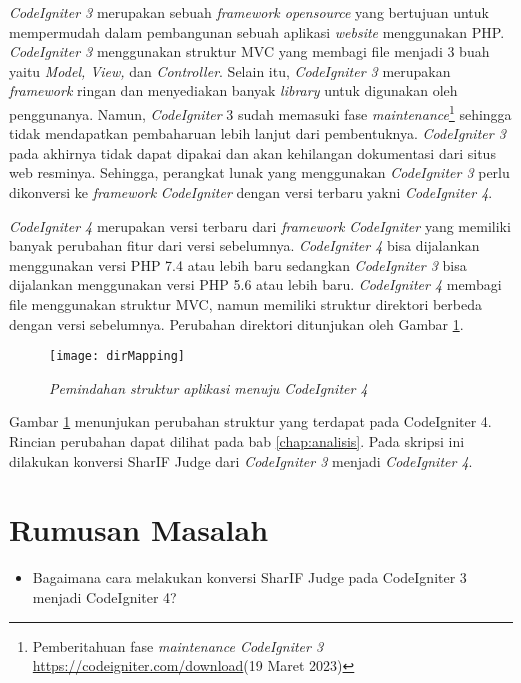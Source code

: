 \textit{CodeIgniter 3} merupakan sebuah \textit{framework opensource} yang bertujuan untuk mempermudah dalam pembangunan sebuah aplikasi \textit{website} menggunakan PHP. \textit{CodeIgniter 3} menggunakan struktur MVC yang membagi file menjadi 3 buah yaitu \textit{Model, View,} dan \textit{Controller}. Selain itu, \textit{CodeIgniter 3} merupakan \textit{framework} ringan dan menyediakan banyak \textit{library} untuk digunakan oleh penggunanya\cite{ci3:22}. Namun, \textit{CodeIgniter} 3 sudah memasuki fase \textit{maintenance}\footnote{Pemberitahuan fase \textit{maintenance CodeIgniter 3} \url{https://codeigniter.com/download}(19 Maret 2023)} sehingga tidak mendapatkan pembaharuan lebih lanjut dari pembentuknya. \textit{CodeIgniter 3} pada akhirnya tidak dapat dipakai dan akan kehilangan dokumentasi dari situs web resminya. Sehingga, perangkat lunak yang menggunakan \textit{CodeIgniter 3} perlu dikonversi ke \textit{framework} \textit{CodeIgniter} dengan versi terbaru yakni \textit{CodeIgniter 4}.

\textit{CodeIgniter 4} merupakan versi terbaru dari \textit{framework} \textit{CodeIgniter} yang memiliki banyak perubahan fitur dari versi sebelumnya. \textit{CodeIgniter 4} bisa dijalankan menggunakan versi PHP 7.4 atau lebih baru sedangkan \textit{CodeIgniter 3} bisa dijalankan menggunakan versi PHP 5.6 atau lebih baru. \textit{CodeIgniter 4} membagi file menggunakan struktur MVC, namun memiliki struktur direktori berbeda dengan versi sebelumnya\cite{codeigniter:23:ci4}. Perubahan direktori ditunjukan oleh Gambar \ref{fig:dirMappingBab1}.
\begin{figure}[H]
	\centering  
	\texttt{[image: dirMapping]}  
	\caption[\textit{Pemindahan struktur aplikasi menuju \textit{CodeIgniter 4}}]{\textit{Pemindahan struktur aplikasi menuju \textit{CodeIgniter 4}}} 
	\label{fig:dirMappingBab1} 
\end{figure}

Gambar \ref{fig:dirMappingBab1} menunjukan perubahan struktur yang terdapat pada CodeIgniter 4. Rincian perubahan dapat dilihat pada bab \ref{chap:analisis}. Pada skripsi ini dilakukan konversi SharIF Judge dari \textit{CodeIgniter 3} menjadi \textit{CodeIgniter 4}.

\section{Rumusan Masalah}
\label{sec:rumusan}
\begin{itemize}
	\item Bagaimana cara melakukan konversi SharIF Judge pada CodeIgniter 3 menjadi CodeIgniter 4?
\end{itemize}
